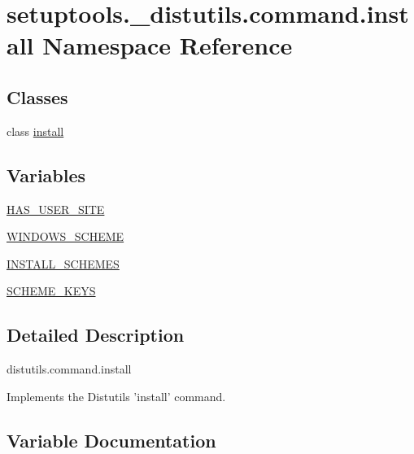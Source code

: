 \hypertarget{namespacesetuptools_1_1__distutils_1_1command_1_1install}{}\section{setuptools.\+\_\+distutils.\+command.\+install Namespace Reference}
\label{namespacesetuptools_1_1__distutils_1_1command_1_1install}
\subsection*{Classes}
\begin{DoxyCompactItemize}
\item 
class \hyperlink{classsetuptools_1_1__distutils_1_1command_1_1install_1_1install}{install}
\end{DoxyCompactItemize}
\subsection*{Variables}
\begin{DoxyCompactItemize}
\item 
\hyperlink{namespacesetuptools_1_1__distutils_1_1command_1_1install_a8814a6b6137e64ddec4ab8c6f589fad9}{H\+A\+S\+\_\+\+U\+S\+E\+R\+\_\+\+S\+I\+TE}
\item 
\hyperlink{namespacesetuptools_1_1__distutils_1_1command_1_1install_a2b0a3ff66fa525572e2eef483d64b969}{W\+I\+N\+D\+O\+W\+S\+\_\+\+S\+C\+H\+E\+ME}
\item 
\hyperlink{namespacesetuptools_1_1__distutils_1_1command_1_1install_ad6cad6636fbb251a6e63089372d54970}{I\+N\+S\+T\+A\+L\+L\+\_\+\+S\+C\+H\+E\+M\+ES}
\item 
\hyperlink{namespacesetuptools_1_1__distutils_1_1command_1_1install_a9528110dde93edd0b5051ebc26fa6c01}{S\+C\+H\+E\+M\+E\+\_\+\+K\+E\+YS}
\end{DoxyCompactItemize}


\subsection{Detailed Description}
\begin{DoxyVerb}distutils.command.install

Implements the Distutils 'install' command.\end{DoxyVerb}
 

\subsection{Variable Documentation}
\mbox{\label{namespacesetuptools_1_1__distutils_1_1command_1_1install_a8814a6b6137e64ddec4ab8c6f589fad9}} 
